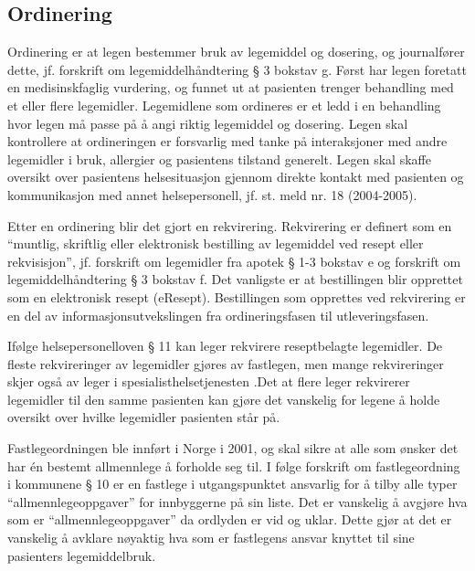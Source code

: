 \subsection{Ordinering}
Ordinering er at legen bestemmer bruk av legemiddel og dosering, og journalfører dette, jf. forskrift om legemiddelhåndtering § 3 bokstav g. Først har legen foretatt en medisinskfaglig vurdering, og funnet ut at pasienten trenger behandling med et eller flere legemidler. Legemidlene som ordineres er et ledd i en behandling hvor legen må passe på å angi riktig legemiddel og dosering. Legen skal kontrollere at ordineringen er forsvarlig med tanke på interaksjoner med andre legemidler i bruk, allergier og pasientens tilstand generelt. Legen skal skaffe oversikt over pasientens helsesituasjon gjennom direkte kontakt med pasienten og kommunikasjon med annet helsepersonell, jf. st. meld nr. 18 (2004-2005).
 
Etter en ordinering blir det gjort en rekvirering. Rekvirering er definert som en “muntlig, skriftlig eller elektronisk bestilling av legemiddel ved resept eller rekvisisjon”, jf. forskrift om legemidler fra apotek § 1-3 bokstav e og forskrift om legemiddelhåndtering § 3 bokstav f. Det vanligste er at bestillingen blir opprettet som en elektronisk resept (eResept). Bestillingen som opprettes ved rekvirering er en del av informasjonsutvekslingen fra ordineringsfasen til utleveringsfasen.
 
Ifølge helsepersonelloven § 11 kan leger rekvirere reseptbelagte legemidler. De fleste rekvireringer av legemidler gjøres av fastlegen, men mange rekvireringer skjer også av leger i spesialisthelsetjenesten \citep{stmeld1820042005}.Det at flere leger rekvirerer legemidler til den samme pasienten kan gjøre det vanskelig for legene å holde oversikt over hvilke legemidler pasienten står på. 

Fastlegeordningen ble innført i Norge i 2001, og skal sikre at alle som ønsker det har én bestemt allmennlege å forholde seg til. I følge forskrift om fastlegeordning i kommunene § 10 er en fastlege i utgangspunktet ansvarlig for å tilby alle typer “allmennlegeoppgaver” for innbyggerne på sin liste.  Det er vanskelig å avgjøre hva som er “allmennlegeoppgaver” da ordlyden er vid og uklar. Dette gjør at det er vanskelig å avklare nøyaktig hva som er fastlegens ansvar knyttet til sine pasienters legemiddelbruk. 

